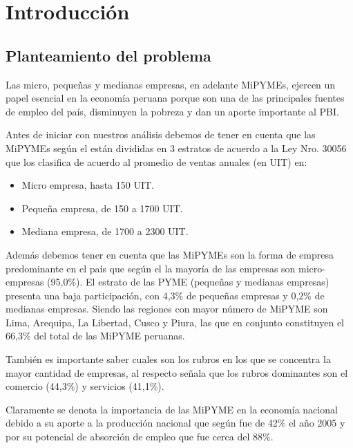 
\chapter{Introducción}

\section{Planteamiento del problema}
Las micro, pequeñas y medianas empresas, en adelante MiPYMEs, ejercen un papel
esencial en la economía peruana porque son una de las principales fuentes de empleo
del país, disminuyen la pobreza y dan un aporte importante al PBI.

Antes de iniciar con nuestros análisis debemos de tener en cuenta que las MiPYMEs
según el \cite{produce2} están divididas en 3 estratos de acuerdo
a la Ley Nro. 30056 que los clasifica de acuerdo al promedio de ventas anuales
(en UIT) en:
\begin{itemize}
  \item Micro empresa, hasta 150 UIT.
  \item Pequeña empresa, de 150 a 1700 UIT.
  \item Mediana empresa, de 1700 a 2300 UIT.
\end{itemize}

Además debemos tener en cuenta que las MiPYMEs son la forma de empresa predominante
en el país que según el \cite{produce} la mayoría de las empresas son
micro-empresas (95,0\%). El estrato de las PYME (pequeñas y medianas empresas) presenta una baja participación,
con 4,3\% de pequeñas empresas y 0,2\% de medianas empresas. Siendo las regiones
con mayor número de MiPYME son Lima, Arequipa, La Libertad, Cusco y Piura, las que
en conjunto constituyen el 66,3\% del total de las MiPYME peruanas.

También es importante saber cuales son los rubros en los que se concentra la mayor cantidad de empresas,
al respecto \cite{produce} señala que los rubros dominantes son el comercio (44,3\%) y servicios (41,1\%).

Claramente se denota la importancia de las MiPYME en la economía nacional debido a su aporte a la
producción nacional que según \cite{arbulu} fue de 42\% el año 2005 y por
su potencial de absorción de empleo que fue cerca del 88\%.

